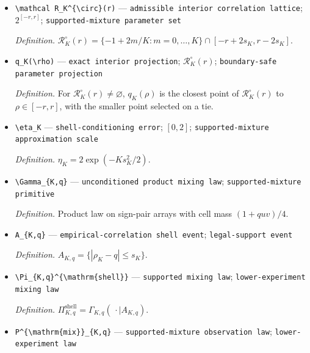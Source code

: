 \documentclass{article}
\begin{document}
\begin{itemize}
  \item \texttt{\textbackslash{}\allowbreak{}mathcal R\_\allowbreak{}K\textasciicircum{}\{\textbackslash{}\allowbreak{}circ\}\allowbreak{}(r)} --- \texttt{admissible interior correlation lattice}; \(2^{[-r,r]}\); \texttt{supported-\allowbreak{}mixture parameter set}
  \par\smallskip\noindent\emph{Definition.} \(\mathcal R_K^{\circ}(r)=\{-1+2m/K:m=0,\ldots,K\}\cap[-r+2s_K,r-2s_K]\).
  \item \texttt{q\_\allowbreak{}K(\textbackslash{}\allowbreak{}rho)} --- \texttt{exact interior projection}; \(\mathcal R_K^{\circ}(r)\); \texttt{boundary-\allowbreak{}safe parameter projection}
  \par\smallskip\noindent\emph{Definition.} For \(\mathcal R_K^{\circ}(r)\neq\varnothing\), \(q_K(\rho)\) is the closest point of \(\mathcal R_K^{\circ}(r)\) to \(\rho\in[-r,r]\), with the smaller point selected on a tie.
  \item \texttt{\textbackslash{}\allowbreak{}eta\_\allowbreak{}K} --- \texttt{shell-\allowbreak{}conditioning error}; \([0,2]\); \texttt{supported-\allowbreak{}mixture approximation scale}
  \par\smallskip\noindent\emph{Definition.} \(\eta_K=2\exp(-K s_K^2/2)\).
  \item \texttt{\textbackslash{}\allowbreak{}Gamma\_\allowbreak{}\{K,\allowbreak{}q\}\allowbreak{}} --- \texttt{unconditioned product mixing law}; \texttt{supported-\allowbreak{}mixture primitive}
  \par\smallskip\noindent\emph{Definition.} Product law on sign-pair arrays with cell mass \((1+quv)/4\).
  \item \texttt{A\_\allowbreak{}\{K,\allowbreak{}q\}\allowbreak{}} --- \texttt{empirical-\allowbreak{}correlation shell event}; \texttt{legal-\allowbreak{}support event}
  \par\smallskip\noindent\emph{Definition.} \(A_{K,q}=\{|\rho_K-q|\le s_K\}\).
  \item \texttt{\textbackslash{}\allowbreak{}Pi\_\allowbreak{}\{K,\allowbreak{}q\}\allowbreak{}\textasciicircum{}\{\textbackslash{}\allowbreak{}mathrm\{shell\}\allowbreak{}\}\allowbreak{}} --- \texttt{supported mixing law}; \texttt{lower-\allowbreak{}experiment mixing law}
  \par\smallskip\noindent\emph{Definition.} \(\Pi_{K,q}^{\mathrm{shell}}=\Gamma_{K,q}(\,\cdot\mid A_{K,q})\).
  \item \texttt{P\textasciicircum{}\{\textbackslash{}\allowbreak{}mathrm\{mix\}\allowbreak{}\}\allowbreak{}\_\allowbreak{}\{K,\allowbreak{}q\}\allowbreak{}} --- \texttt{supported-\allowbreak{}mixture observation law}; \texttt{lower-\allowbreak{}experiment law}

\end{itemize}
\end{document}
